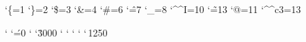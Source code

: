 
\catcode`\{=1
\catcode`\}=2
\catcode`\$=3
\catcode`\&=4
\catcode`\#=6
\catcode`\^=7
\catcode`\_=8
\catcode`\^^I=10
\catcode`\~=13
\catcode`@=11
\catcode`\^^c3=13

\sfcode` \sfcode`\'=0 \sfcode` \sfcode`\.3000 \sfcode`
\sfcode` \sfcode` \sfcode` \sfcode`\,1250

